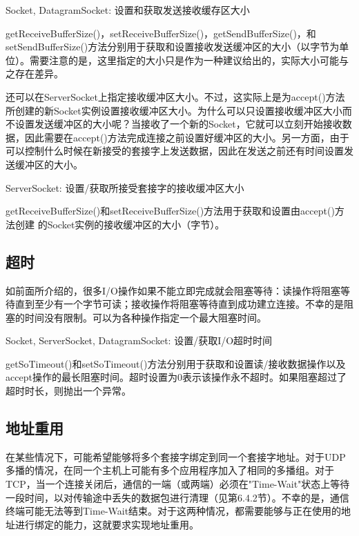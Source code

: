 		Socket, DatagramSocket: 设置和获取发送接收缓存区大小 

		

		getReceiveBufferSize()，setReceiveBufferSize()，getSendBufferSize()，和setSendBufferSize()方法分别用于获取和设置接收发送缓冲区的大小（以字节为单位）。需要注意的是，这里指定的大小只是作为一种建议给出的，实际大小可能与之存在差异。 

		还可以在ServerSocket上指定接收缓冲区大小。不过，这实际上是为accept()方法所创建的新Socket实例设置接收缓冲区大小。为什么可以只设置接收缓冲区大小而不设置发送缓冲区的大小呢？当接收了一个新的Socket，它就可以立刻开始接收数据，因此需要在accept()方法完成连接之前设置好缓冲区的大小。另一方面，由于可以控制什么时候在新接受的套接字上发送数据，因此在发送之前还有时间设置发送缓冲区的大小。 

		ServerSocket: 设置/获取所接受套接字的接收缓冲区大小 

		

		getReceiveBufferSize()和setReceiveBufferSize()方法用于获取和设置由accept()方法创建
的Socket实例的接收缓冲区的大小（字节）。 

	\subsection{超时} 

		如前面所介绍的，很多I/O操作如果不能立即完成就会阻塞等待：读操作将阻塞等待直到至少有一个字节可读；接收操作将阻塞等待直到成功建立连接。不幸的是阻塞的时间没有限制。可以为各种操作指定一个最大阻塞时间。 

		Socket, ServerSocket, DatagramSocket: 设置/获取I/O超时时间 

		
		
		getSoTimeout()和setSoTimeout()方法分别用于获取和设置读/接收数据操作以及accept操作的最长阻塞时间。超时设置为0表示该操作永不超时。如果阻塞超过了超时时长，则抛出一个异常。 

	\subsection{地址重用} 

		在某些情况下，可能希望能够将多个套接字绑定到同一个套接字地址。对于UDP多播的情况，在同一个主机上可能有多个应用程序加入了相同的多播组。对于TCP，当一个连接关闭后，通信的一端（或两端）必须在"Time-Wait"状态上等待一段时间，以对传输途中丢失的数据包进行清理（见第6.4.2节）。不幸的是，通信终端可能无法等到Time-Wait结束。对于这两种情况，都需要能够与正在使用的地址进行绑定的能力，这就要求实现地址重用。 

